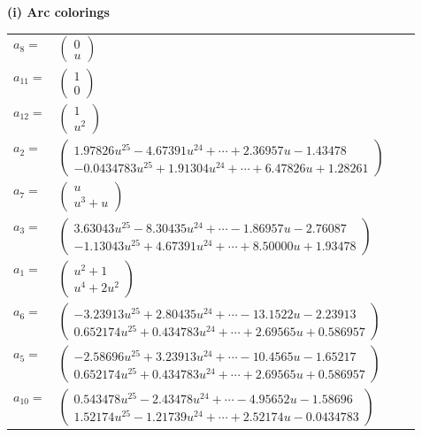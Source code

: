 \documentclass[1p]{elsarticle_modified}
\theoremstyle{definition}
\begin{document}
\flushleft \textbf{(i) Arc colorings}\\
\begin{tabular}{m{7pt} m{180pt} m{7pt} m{180pt} }
\flushright $a_{8}=$&$\begin{pmatrix}0\\u\end{pmatrix}$ \\
\flushright $a_{11}=$&$\begin{pmatrix}1\\0\end{pmatrix}$ \\
\flushright $a_{12}=$&$\begin{pmatrix}1\\u^2\end{pmatrix}$ \\
\flushright $a_{2}=$&$\begin{pmatrix}1.97826 u^{25}-4.67391 u^{24}+\cdots+2.36957 u-1.43478\\-0.0434783 u^{25}+1.91304 u^{24}+\cdots+6.47826 u+1.28261\end{pmatrix}$ \\
\flushright $a_{7}=$&$\begin{pmatrix}u\\u^3+u\end{pmatrix}$ \\
\flushright $a_{3}=$&$\begin{pmatrix}3.63043 u^{25}-8.30435 u^{24}+\cdots-1.86957 u-2.76087\\-1.13043 u^{25}+4.67391 u^{24}+\cdots+8.50000 u+1.93478\end{pmatrix}$ \\
\flushright $a_{1}=$&$\begin{pmatrix}u^2+1\\u^4+2 u^2\end{pmatrix}$ \\
\flushright $a_{6}=$&$\begin{pmatrix}-3.23913 u^{25}+2.80435 u^{24}+\cdots-13.1522 u-2.23913\\0.652174 u^{25}+0.434783 u^{24}+\cdots+2.69565 u+0.586957\end{pmatrix}$ \\
\flushright $a_{5}=$&$\begin{pmatrix}-2.58696 u^{25}+3.23913 u^{24}+\cdots-10.4565 u-1.65217\\0.652174 u^{25}+0.434783 u^{24}+\cdots+2.69565 u+0.586957\end{pmatrix}$ \\
\flushright $a_{10}=$&$\begin{pmatrix}0.543478 u^{25}-2.43478 u^{24}+\cdots-4.95652 u-1.58696\\1.52174 u^{25}-1.21739 u^{24}+\cdots+2.52174 u-0.0434783\end{pmatrix}$ \\

\end{tabular}
\end{document}
